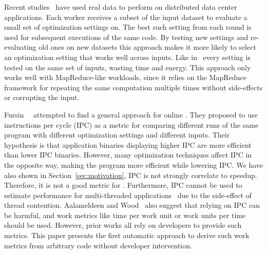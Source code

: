 Recent studies~\cite{chen12b,fang15} have used real data to perform {\itercomp} on distributed data center applications. Each worker
receives a subset of the input dataset to evaluate a small set of optimization settings on. The best such setting from each round is used
for subsequent executions of the same code. By testing new settings and re-evaluating old ones on new datasets this approach makes it more
likely to select an optimization setting that works well across inputs. Like in~\cite{chen10} every setting is tested on the same set of
inputs, wasting time and energy. This approach only works well with MapReduce-like workloads, since it relies on the MapReduce framework
for repeating the same computation multiple times without side-effects or corrupting the input.

Fursin~\etal~\cite{fursin07} attempted to find a general approach for online \itercomp. They proposed to use instructions per cycle (IPC)
as a metric for comparing different runs of the same program with different optimization settings and different inputs. Their hypothesis is
that application binaries displaying higher IPC are more efficient than lower IPC binaries. However, many optimization techniques affect
IPC in the opposite way, making the program more efficient while lowering IPC. We have also shown in Section~\ref{sec:motivation}, IPC is
not strongly correlate to speedup. Therefore, it is not a good metric for \itercomp. Furthermore, IPC cannot be used to estimate
performance for multi-threaded applications~\cite{alameldeen06,eyerman08} due to the side-effect of thread contention. Aalameldeen and
Wood~\cite{alameldeen06} also suggest that relying on IPC can be harmful, and work metrics like time per work unit or work units per time
should be used. However, prior works all rely on developers to provide such metrics. This paper presents the first automatic approach to
derive such work metrics from arbitrary code without developer intervention.



